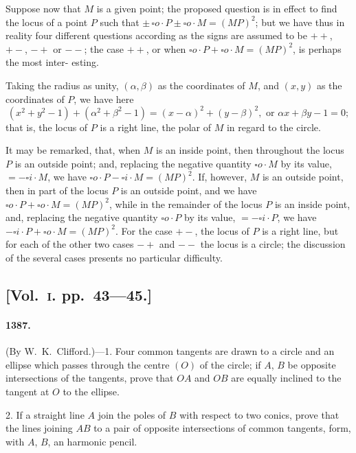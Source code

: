 \documentclass[11pt,a4paper]{article}
\begin{document}
Suppose now that $M$ is a given point; the proposed question is in effect to find
the locus of a point $P$ such that $\pm\, \square o \cdot P \pm \square o \cdot M = (MP)^2$; but we have thus in
reality four different questions according as the signs are assumed to be $++$, $+-$, $-+$
or $--$; the case $++$, or when $\square o \cdot P + \square o \cdot M = (MP)^2$, is perhaps the most inter-
\noindent esting.

Taking the radius as unity, $(\alpha, \beta)$ as the coordinates of $M$, and $(x, y)$ as the
coordinates of $P$, we have here
\[
(x^2+y^2-1) + (\alpha^2+\beta^2-1) = (x-\alpha)^2 + (y-\beta)^2, \text{ or } \alpha x + \beta y - 1 = 0;
\]
that is, the locus of $P$ is a right line, the polar of $M$ in regard to the circle.

It may be remarked, that, when $M$ is an inside point, then throughout the locus
$P$ is an outside point; and, replacing the negative quantity $\square o \cdot M$ by its value,
$=-\square i \cdot M$, we have $\square o \cdot P - \square i \cdot M = (MP)^2$. If, however, $M$ is an outside point, then
in part of the locus $P$ is an outside point, and we have $\square o \cdot P + \square o \cdot M = (MP)^2$, while
in the remainder of the locus $P$ is an inside point, and, replacing the negative
quantity $\square o \cdot P$ by its value, $=-\square i \cdot P$, we have $-\square i \cdot P + \square o \cdot M = (MP)^2$. For the
case $+-$, the locus of $P$ is a right line, but for each of the other two cases
$-+$ and $--$ the locus is a circle; the discussion of the several cases presents no
particular difficulty.


\subsection*{[Vol.~\textsc{i}. pp.\ 43---45.]}

\paragraph*{1387.} (By W.~K.~Clifford.)---1. Four common tangents are drawn to a circle
and an ellipse which passes through the centre $(O)$ of the circle; if $A$, $B$ be opposite
intersections of the tangents, prove that $OA$ and $OB$ are equally inclined to the
tangent at $O$ to the ellipse.

2. If a straight line $A$ join the poles of $B$ with respect to two conics, prove
that the lines joining $AB$ to a pair of opposite intersections of common tangents,
form, with $A$, $B$, an harmonic pencil.
\end{document}
